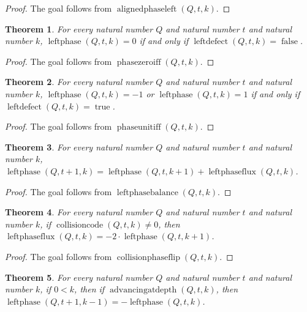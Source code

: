 \documentclass[11pt]{article}
\newtheorem{theorem}{Theorem}[section]
\theoremstyle{definition}
\begin{document}
\begin{proof}
The goal follows from \(\operatorname{alignedphaseleft}(Q, t, k)\).
\end{proof}
\begin{theorem}
\label{ll:observations:phase-zero-iff}
For every natural number \(Q\) and natural number \(t\) and natural number \(k\), \(\operatorname{leftphase}(Q, t, k) = 0\) if and only if \(\operatorname{leftdefect}(Q, t, k) = \operatorname{false}\).
\end{theorem}
\begin{proof}
The goal follows from \(\operatorname{phasezeroiff}(Q, t, k)\).
\end{proof}
\begin{theorem}
\label{ll:observations:phase-unit-iff}
For every natural number \(Q\) and natural number \(t\) and natural number \(k\), \(\operatorname{leftphase}(Q, t, k) = -1\) or \(\operatorname{leftphase}(Q, t, k) = 1\) if and only if \(\operatorname{leftdefect}(Q, t, k) = \operatorname{true}\).
\end{theorem}
\begin{proof}
The goal follows from \(\operatorname{phaseunitiff}(Q, t, k)\).
\end{proof}
\begin{theorem}
\label{ll:observations:left-phase-balance}
For every natural number \(Q\) and natural number \(t\) and natural number \(k\), \(\operatorname{leftphase}(Q, t + 1, k) = \operatorname{leftphase}(Q, t, k + 1) + \operatorname{leftphaseflux}(Q, t, k)\).
\end{theorem}
\begin{proof}
The goal follows from \(\operatorname{leftphasebalance}(Q, t, k)\).
\end{proof}
\begin{theorem}
\label{ll:observations:collision-phase-flip}
For every natural number \(Q\) and natural number \(t\) and natural number \(k\), if \(\operatorname{collisioncode}(Q, t, k) \ne 0\), then \(\operatorname{leftphaseflux}(Q, t, k) = -2 \cdot \operatorname{leftphase}(Q, t, k + 1)\).
\end{theorem}
\begin{proof}
The goal follows from \(\operatorname{collisionphaseflip}(Q, t, k)\).
\end{proof}
\begin{theorem}
\label{ll:observations:advancing-phase-flip}
For every natural number \(Q\) and natural number \(t\) and natural number \(k\), if \(0 < k\), then if \(\operatorname{advancingatdepth}(Q, t, k)\), then \(\operatorname{leftphase}(Q, t + 1, k - 1) = -\operatorname{leftphase}(Q, t, k)\).
\end{theorem}
\end{document}
